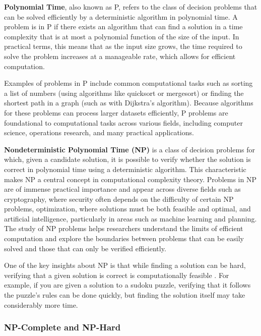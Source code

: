 \textbf{ Polynomial Time}, also known as P, refers to the class of decision problems that can be solved efficiently by a deterministic algorithm in polynomial time. A problem is in P if there exists an algorithm that can find a solution in a time complexity that is at most a polynomial function of the size of the input\cite{cormen2009}. In practical terms, this means that as the input size grows, the time required to solve the problem increases at a manageable rate, which allows for efficient computation.

Examples of problems in P include common computational tasks such as sorting a list of numbers (using algorithms like quicksort or mergesort) or finding the shortest path in a graph (such as with Dijkstra's algorithm). Because algorithms for these problems can process larger datasets efficiently, P problems are foundational to computational tasks across various fields, including computer science, operations research, and many practical applications.

\textbf{Nondeterministic Polynomial Time (NP)} is a class of decision problems for which, given a candidate solution, it is possible to verify whether the solution is correct in polynomial time using a deterministic algorithm. This characteristic makes NP a central concept in computational complexity theory. Problems in NP are of immense practical importance and appear across diverse fields such as cryptography, where security often depends on the difficulty of certain NP problems, optimization, where solutions must be both feasible and optimal, and artificial intelligence, particularly in areas such as machine learning and planning. The study of NP problems helps researchers understand the limits of efficient computation and explore the boundaries between problems that can be easily solved and those that can only be verified efficiently.

One of the key insights about NP is that while finding a solution can be hard, verifying that a given solution is correct is computationally feasible \cite{cook2000p}. For example, if you are given a solution to a sudoku puzzle, verifying that it follows the puzzle’s rules can be done quickly, but finding the solution itself may take considerably more time.

\subsubsection*{NP-Complete and NP-Hard}

